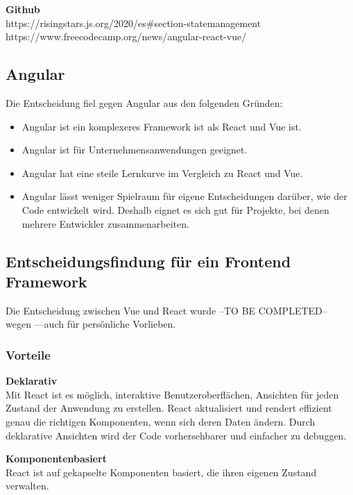 \textbf{Github}\\
https://risingstars.js.org/2020/es#section-statemanagement
\\
https://www.freecodecamp.org/news/angular-react-vue/
\\
\subsection{Angular}
Die Entscheidung fiel gegen Angular aus den folgenden Gründen:
\begin{itemize}
\item
    Angular ist ein komplexeres Framework ist als React und Vue ist.
\item
    Angular ist für Unternehmensanwendungen geeignet. 
\item
    Angular hat eine steile Lernkurve im Vergleich zu React und Vue.{\cite{E01}}
\item
    Angular lässt weniger Spielraum für eigene Entscheidungen darüber, wie der Code entwickelt wird. Deshalb eignet es sich gut für Projekte, bei denen mehrere Entwickler zusammenarbeiten. 
\end{itemize}
\subsection{Entscheidungsfindung für ein Frontend Framework}
Die Entscheidung zwischen Vue und React wurde --TO BE COMPLETED-- wegen ---auch für persönliche Vorlieben.
\newline
\subsubsection{Vorteile}
\textbf{Deklarativ} \\
Mit React ist es möglich, interaktive Benutzeroberflächen, Ansichten für jeden Zustand der Anwendung zu erstellen. React aktualisiert und rendert effizient genau die richtigen Komponenten, wenn sich deren Daten ändern.
Durch deklarative Ansichten wird der Code vorhersehbarer und einfacher zu debuggen.
\newline

\textbf{Komponentenbasiert}\\
React ist auf gekapselte Komponenten basiert, die ihren eigenen Zustand verwalten.
\newline

